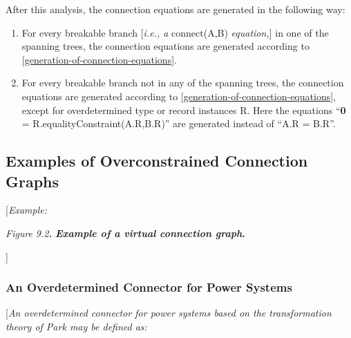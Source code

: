 \documentclass[10pt,a4paper]{report}
\def\doublelabel#1{\label{#1}\hypertarget{#1}{}}
\renewcommand{\labelenumi}{\arabic{enumi}.}
\begin{document}
After this analysis, the connection equations are generated in the
following way:

\begin{enumerate}
\def\labelenumi{\arabic{enumi}.}
\item
  For every breakable branch {[}\emph{i.e., a} connect(A,B)
  \emph{equation,}{]} in one of the spanning trees, the connection
  equations are generated according to \ref{generation-of-connection-equations}.
\item
  For every breakable branch not in any of the spanning trees, the
  connection equations are generated according to \ref{generation-of-connection-equations}, except
  for overdetermined type or record instances R. Here the equations
  ``\textbf{0} = R.equalityConstraint(A.R,B.R)'' are generated instead
  of ``A.R = B.R''.
\end{enumerate}

\subsection{Examples of Overconstrained Connection Graphs}\doublelabel{examples-of-overconstrained-connection-graphs}

{[}\emph{Example:}

\emph{Figure} \emph{9.2\textbf{. }} \textbf{\emph{Example of a virtual
connection graph}.}

{]}

\subsubsection{An Overdetermined Connector for Power Systems}\doublelabel{an-overdetermined-connector-for-power-systems}

{[}\emph{An overdetermined connector for power systems based on the
transformation theory of Park may be defined as:}
\end{document}

